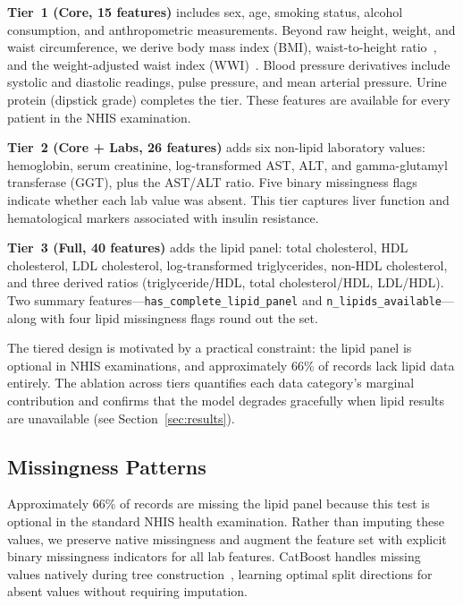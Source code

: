 \textbf{Tier~1 (Core, 15 features)} includes sex, age, smoking status, alcohol consumption, and anthropometric measurements. Beyond raw height, weight, and waist circumference, we derive body mass index (BMI), waist-to-height ratio~\cite{Xu2013waist}, and the weight-adjusted waist index (WWI)~\cite{He2022anthropometric}. Blood pressure derivatives include systolic and diastolic readings, pulse pressure, and mean arterial pressure. Urine protein (dipstick grade) completes the tier. These features are available for every patient in the NHIS examination.

\textbf{Tier~2 (Core + Labs, 26 features)} adds six non-lipid laboratory values: hemoglobin, serum creatinine, log-transformed AST, ALT, and gamma-glutamyl transferase (GGT), plus the AST/ALT ratio. Five binary missingness flags indicate whether each lab value was absent. This tier captures liver function and hematological markers associated with insulin resistance.

\textbf{Tier~3 (Full, 40 features)} adds the lipid panel: total cholesterol, HDL cholesterol, LDL cholesterol, log-transformed triglycerides, non-HDL cholesterol, and three derived ratios (triglyceride/HDL, total cholesterol/HDL, LDL/HDL). Two summary features---\texttt{has\_complete\_lipid\_panel} and \texttt{n\_lipids\_available}---along with four lipid missingness flags round out the set.

The tiered design is motivated by a practical constraint: the lipid panel is optional in NHIS examinations, and approximately 66\% of records lack lipid data entirely. The ablation across tiers quantifies each data category's marginal contribution and confirms that the model degrades gracefully when lipid results are unavailable (see Section~\ref{sec:results}).

\subsection{Missingness Patterns}
\label{sec:missingness}

Approximately 66\% of records are missing the lipid panel because this test is optional in the standard NHIS health examination. Rather than imputing these values, we preserve native missingness and augment the feature set with explicit binary missingness indicators for all lab features. CatBoost handles missing values natively during tree construction~\cite{Singh2021missingness}, learning optimal split directions for absent values without requiring imputation.

